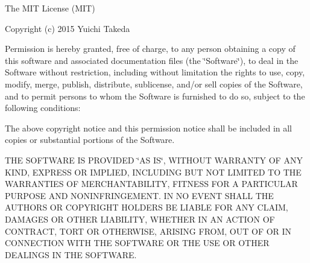The M\+IT License (M\+IT)

Copyright (c) 2015 Yuichi Takeda

Permission is hereby granted, free of charge, to any person obtaining a copy of this software and associated documentation files (the \char`\"{}\+Software\char`\"{}), to deal in the Software without restriction, including without limitation the rights to use, copy, modify, merge, publish, distribute, sublicense, and/or sell copies of the Software, and to permit persons to whom the Software is furnished to do so, subject to the following conditions\+:

The above copyright notice and this permission notice shall be included in all copies or substantial portions of the Software.

T\+HE S\+O\+F\+T\+W\+A\+RE IS P\+R\+O\+V\+I\+D\+ED \char`\"{}\+A\+S I\+S\char`\"{}, W\+I\+T\+H\+O\+UT W\+A\+R\+R\+A\+N\+TY OF A\+NY K\+I\+ND, E\+X\+P\+R\+E\+SS OR I\+M\+P\+L\+I\+ED, I\+N\+C\+L\+U\+D\+I\+NG B\+UT N\+OT L\+I\+M\+I\+T\+ED TO T\+HE W\+A\+R\+R\+A\+N\+T\+I\+ES OF M\+E\+R\+C\+H\+A\+N\+T\+A\+B\+I\+L\+I\+TY, F\+I\+T\+N\+E\+SS F\+OR A P\+A\+R\+T\+I\+C\+U\+L\+AR P\+U\+R\+P\+O\+SE A\+ND N\+O\+N\+I\+N\+F\+R\+I\+N\+G\+E\+M\+E\+NT. IN NO E\+V\+E\+NT S\+H\+A\+LL T\+HE A\+U\+T\+H\+O\+RS OR C\+O\+P\+Y\+R\+I\+G\+HT H\+O\+L\+D\+E\+RS BE L\+I\+A\+B\+LE F\+OR A\+NY C\+L\+A\+IM, D\+A\+M\+A\+G\+ES OR O\+T\+H\+ER L\+I\+A\+B\+I\+L\+I\+TY, W\+H\+E\+T\+H\+ER IN AN A\+C\+T\+I\+ON OF C\+O\+N\+T\+R\+A\+CT, T\+O\+RT OR O\+T\+H\+E\+R\+W\+I\+SE, A\+R\+I\+S\+I\+NG F\+R\+OM, O\+UT OF OR IN C\+O\+N\+N\+E\+C\+T\+I\+ON W\+I\+TH T\+HE S\+O\+F\+T\+W\+A\+RE OR T\+HE U\+SE OR O\+T\+H\+ER D\+E\+A\+L\+I\+N\+GS IN T\+HE S\+O\+F\+T\+W\+A\+RE. 
